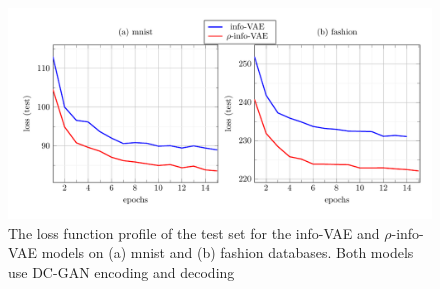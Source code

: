 \documentclass{article}
\begin{document}
%
%



 \begin{figure}  [!t]
   \begin{center} 
\includegraphics[width=1.0\textwidth]{figs/curves/INFO_VAE.pdf}
\end{center}
\vspace{-.75cm}  
   \caption{The loss function profile of the test set for the info-VAE and $\rho$-info-VAE models on (a) mnist and (b) fashion databases. Both models use DC-GAN encoding and decoding}
   \label{fig:curve_INFOVAE}
   \end{figure}
\end{document}
